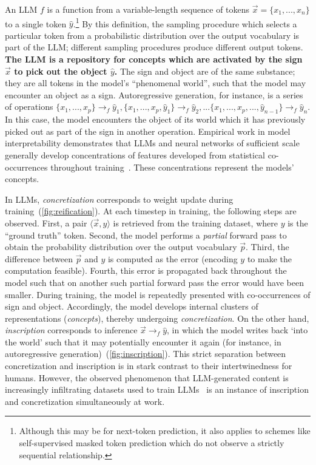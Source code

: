 An LLM $f$ is a function from a variable-length sequence of tokens $\vec x = \{ x_1, ..., x_n \}$ to a single token $\hat{y}$.\footnote{Although this may be for next-token prediction, it also applies to schemes like self-supervised masked token prediction which do not observe a strictly sequential relationship.}
By this definition, the sampling procedure which selects a particular token from a probabilistic distribution over the output vocabulary is part of the LLM; different sampling procedures produce different output tokens.
\textbf{The LLM is a repository for concepts which are activated by the sign $\vec x$ to pick out the object $\hat{y}$. }
The sign and object are of the same substance; they are all tokens in the model's ``phenomenal world'', such that the model may encounter an object as a sign.
Autoregressive generation, for instance, is a series of operations $\{x_1, ..., x_p\} \to_f \hat{y}_1, \{x_1, ..., x_p, \hat{y}_1 \} \to_f \hat{y}_2, ... \{x_1, ..., x_p, ..., \hat{y}_{n-1}\} \to_f \hat{y}_n$.
In this case, the model encounters the object of its world which it has previously picked out as part of the sign in another operation.
Empirical work in model interpretability demonstrates that LLMs and neural networks of sufficient scale generally develop concentrations of features developed from statistical co-occurrences throughout training~\citep{Frankle2018TheLT,Kauffmann2019FromCT,Zhang2020ASO}. These concentrations represent the models' concepts.

In LLMs, \textit{concretization} corresponds to weight update during training~(\ref{fig:reification}). At each timestep in training, the following steps are observed.
First, a pair $\langle \vec x, y \rangle$ is retrieved from the training dataset, where $y$ is the ``ground truth'' token.
Second, the model performs a \textit{partial} forward pass to obtain the probability distribution over the output vocabulary $\vec{p}$. 
Third, the difference between $\vec{p}$ and $y$ is computed as the error (encoding $y$ to make the computation feasible). 
Fourth, this error is propagated back throughout the model such that on another such partial forward pass the error would have been smaller.
During training, the model is repeatedly presented with co-occurrences of sign and object. Accordingly, the model develops internal clusters of representations (\textit{concepts}), thereby undergoing \textit{concretization}.
On the other hand, \textit{inscription} corresponds to inference $\vec x \to_f \hat{y}$, in which the model writes back `into the world' such that it may potentially encounter it again (for instance, in autoregressive generation)~(\ref{fig:inscription}).
This strict separation between concretization and inscription is in stark contrast to their intertwinedness for humans.
However, the observed phenomenon that LLM-generated content is increasingly infiltrating datasets used to train LLMs~\citep{Shumailov:Curse} is an instance of inscription and concretization simultaneously at work.

